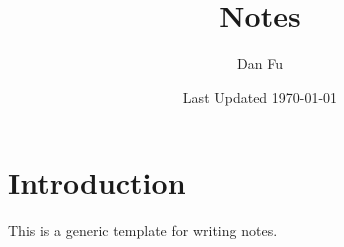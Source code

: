 \documentclass[11pt]{article}
\begin{document}
\title{Notes}
\author{Dan Fu}
\date{Last Updated \today}

\maketitle

\nocite{*}

\section{Introduction}

This is a generic template for writing notes.




\appendix
\end{document}
